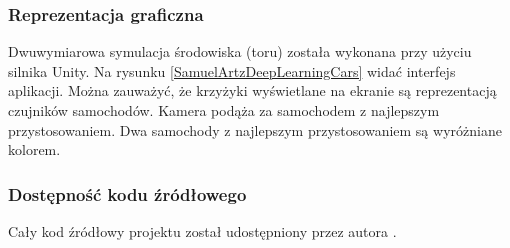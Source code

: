\subsubsection{Reprezentacja graficzna}
Dwuwymiarowa symulacja środowiska (toru) została wykonana przy użyciu silnika Unity. Na rysunku \ref{SamuelArtzDeepLearningCars} widać interfejs aplikacji. Można zauważyć, że krzyżyki wyświetlane na ekranie są reprezentacją czujników samochodów. Kamera podąża za samochodem z najlepszym przystosowaniem. Dwa samochody z najlepszym przystosowaniem są wyróżniane kolorem.

\subsubsection{Dostępność kodu źródłowego}
Cały kod źródłowy projektu został udostępniony przez autora \cite{artz:deepLearningCars:github}.

